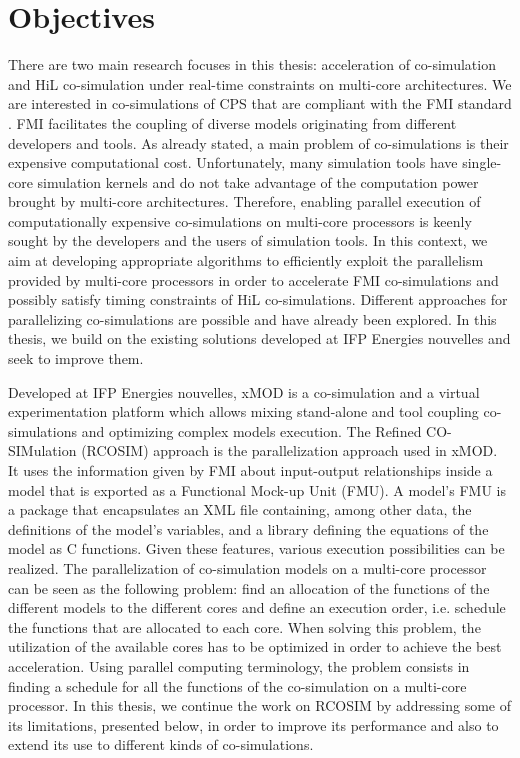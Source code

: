 \section{Objectives}

There are two main research focuses in this thesis: acceleration of co-simulation and HiL co-simulation under real-time constraints on multi-core architectures. We are interested in co-simulations of CPS that are compliant with the FMI standard \cite{fmi:2014}. FMI facilitates the coupling of diverse models originating from different developers and tools. As already stated, a main problem of co-simulations is their expensive computational cost. Unfortunately, many simulation tools have single-core simulation kernels and do not take advantage of the computation power brought by multi-core architectures. Therefore, enabling parallel execution of computationally expensive co-simulations on multi-core processors is keenly sought by the developers and the users of simulation tools. In this context, we aim at developing appropriate algorithms to efficiently exploit the parallelism provided by multi-core processors in order to accelerate FMI co-simulations and possibly satisfy timing constraints of HiL co-simulations. Different approaches for parallelizing co-simulations are possible and have already been explored. In this thesis, we build on the existing solutions developed at IFP Energies nouvelles and seek to improve them. 

Developed at IFP Energies nouvelles, xMOD is a co-simulation and a virtual experimentation platform which allows mixing stand-alone and tool coupling co-simulations and optimizing complex models execution. The Refined CO-SIMulation (RCOSIM) approach \cite{benkhaled:2014} is the parallelization approach used in xMOD. It uses the information given by FMI about input-output relationships inside a model that is exported as a Functional Mock-up Unit (FMU). A model's FMU is a package that encapsulates an XML file containing, among other data, the definitions of the model's variables, and a library defining the equations of the model as C functions. Given these features, various execution possibilities can be realized. The parallelization of co-simulation models on a multi-core processor can be seen as the following problem: find an allocation of the functions of the different models to the different cores and define an execution order, i.e. schedule the functions that are allocated to each core. When solving this problem, the utilization of the available cores has to be optimized in order to achieve the best acceleration. Using parallel computing terminology, the problem consists in finding a schedule for all the functions of the co-simulation on a multi-core processor. In this thesis, we continue the work on RCOSIM by addressing some of its limitations, presented below, in order to improve its performance and also to extend its use to different kinds of co-simulations.

